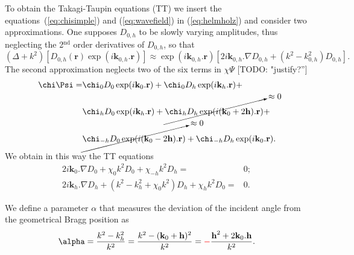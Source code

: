 \documentclass[preprint]{iucr}              %
\newcommand{\todo}[1]{{\color{red}[TODO: "#1'']}}
\newcommand{\inred}[1]{{\color{red}#1}}
\begin{document}
To obtain the Takagi-Taupin equations (TT) we insert the equations~(\ref{eq:chisimple}) and (\ref{eq:wavefield}) in (\ref{eq:helmholz}) and consider two approximations. One supposes $D_{0,h}$ to be slowly varying amplitudes, thus neglecting the 2$^{\text{nd}}$ order derivatives of $D_{0,h}$,  so that
\begin{equation}
\label{eq:approxslowlyvarying}
(\Delta + k^2)[D_{0,h}(\textbf{r}) \exp(i\textbf{k}_{0,h} . \textbf{r})] \approx \exp(i\textbf{k}_{0,h} . \textbf{r}) [2 i \textbf{k}_{0,h} . \nabla D_{0,h} + (k^2 - k^2_{0,h}) D_{0,h}].
\end{equation}
The second approximation neglects two of the six terms in $\chi \Psi$ \todo{justify?}
\begin{subequations}
\label{eq:approxchiPsi}
\begin{align}
\chi\Psi =&
\chi_0 D_0 \exp(i \textbf{k}_0 . \textbf{r}) +
\chi_0 D_h \exp(i \textbf{k}_h . \textbf{r}) +\\
&\chi_h D_0 \exp(i \textbf{k}_h . \textbf{r}) +
\cancelto{\approx 0}{\chi_h D_h \exp(i (\textbf{k}_0+2\textbf{h}) . \textbf{r})} +\\
&\cancelto{\approx 0}{\chi_{-h} D_0 \exp(i (\textbf{k}_0 - 2 \textbf{h}) .\textbf{r})} +
\chi_{-h} D_h \exp(i \textbf{k}_0 . \textbf{r}) .
\end{align}
\end{subequations}
We obtain in this way the TT equations 
\begin{subequations}
\label{eq:TTvector}
\begin{align}
2 i \textbf{k}_0 . \nabla D_0 + \chi_0 k^2 D_0 + \chi_{-h} k^2 D_h =& 0; \\
2 i \textbf{k}_h . \nabla D_h + (k^2 - k_h^2 + \chi_0 k^2) D_h + \chi_{h} k^2 D_0 =& 0.
\end{align}
\end{subequations}

We define a parameter $\alpha$ that measures the deviation of the incident angle from the geometrical Bragg position as
\begin{equation}
\label{eq:alpha}
\alpha = \frac{k^2-k_h^2}{k^2} = \frac{k^2-(\textbf k_0 + \textbf h)^2}{k^2} = \inred{-} \frac{\textbf h^2 + 2 \textbf k_0 . \textbf h}{k^2}.
\end{equation}
\end{document}
